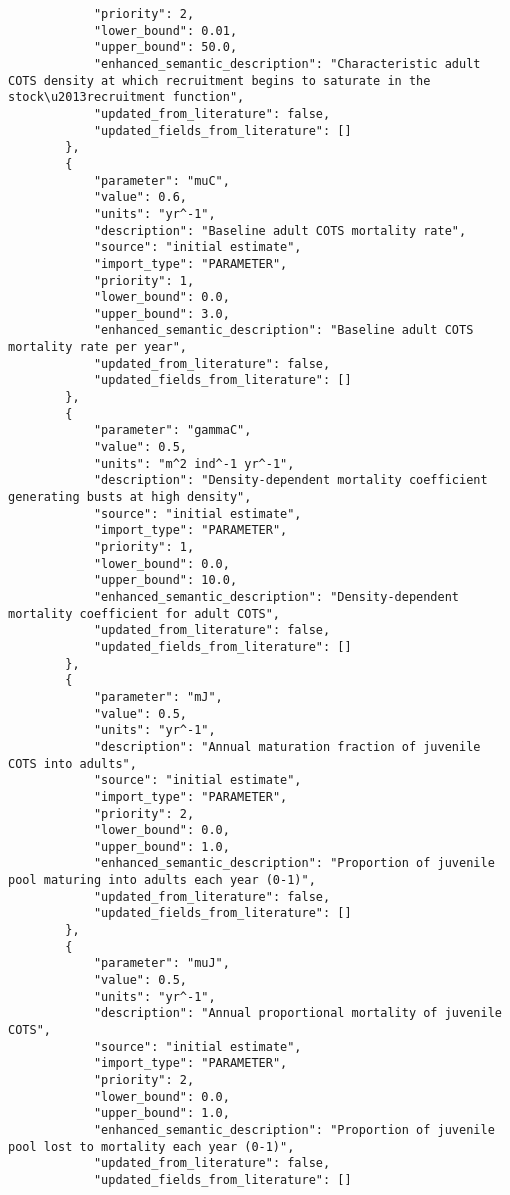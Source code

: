 \begin{lstlisting}
            "priority": 2,
            "lower_bound": 0.01,
            "upper_bound": 50.0,
            "enhanced_semantic_description": "Characteristic adult COTS density at which recruitment begins to saturate in the stock\u2013recruitment function",
            "updated_from_literature": false,
            "updated_fields_from_literature": []
        },
        {
            "parameter": "muC",
            "value": 0.6,
            "units": "yr^-1",
            "description": "Baseline adult COTS mortality rate",
            "source": "initial estimate",
            "import_type": "PARAMETER",
            "priority": 1,
            "lower_bound": 0.0,
            "upper_bound": 3.0,
            "enhanced_semantic_description": "Baseline adult COTS mortality rate per year",
            "updated_from_literature": false,
            "updated_fields_from_literature": []
        },
        {
            "parameter": "gammaC",
            "value": 0.5,
            "units": "m^2 ind^-1 yr^-1",
            "description": "Density-dependent mortality coefficient generating busts at high density",
            "source": "initial estimate",
            "import_type": "PARAMETER",
            "priority": 1,
            "lower_bound": 0.0,
            "upper_bound": 10.0,
            "enhanced_semantic_description": "Density-dependent mortality coefficient for adult COTS",
            "updated_from_literature": false,
            "updated_fields_from_literature": []
        },
        {
            "parameter": "mJ",
            "value": 0.5,
            "units": "yr^-1",
            "description": "Annual maturation fraction of juvenile COTS into adults",
            "source": "initial estimate",
            "import_type": "PARAMETER",
            "priority": 2,
            "lower_bound": 0.0,
            "upper_bound": 1.0,
            "enhanced_semantic_description": "Proportion of juvenile pool maturing into adults each year (0-1)",
            "updated_from_literature": false,
            "updated_fields_from_literature": []
        },
        {
            "parameter": "muJ",
            "value": 0.5,
            "units": "yr^-1",
            "description": "Annual proportional mortality of juvenile COTS",
            "source": "initial estimate",
            "import_type": "PARAMETER",
            "priority": 2,
            "lower_bound": 0.0,
            "upper_bound": 1.0,
            "enhanced_semantic_description": "Proportion of juvenile pool lost to mortality each year (0-1)",
            "updated_from_literature": false,
            "updated_fields_from_literature": []

\end{lstlisting}
